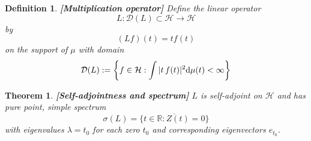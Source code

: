 \documentclass{article}
\newcommand{\assign}{:=}
\newcommand{\mathd}{\mathrm{d}}
\newcommand{\tmstrong}[1]{\textbf{#1}}
\newtheorem{definition}{Definition}
\newtheorem{theorem}{Theorem}
\begin{document}
\begin{definition}
  {\tmstrong{[Multiplication operator]\label{def:L}}} Define the linear
  operator
  \begin{equation}
    L : \mathcal{D} (L) \subset \mathcal{H} \to \mathcal{H}
  \end{equation}
  by
  \begin{equation}
    (Lf) (t) = tf (t)
  \end{equation}
  on the support of $\mu$ with domain
  \begin{equation}
    \mathcal{D} (L) \assign \left\{ f \in \mathcal{H}: \int |t \hspace{0.17em}
    f (t) |^2 \mathd \mu (t) < \infty \right\}
  \end{equation}
\end{definition}

\begin{theorem}
  {\tmstrong{[Self-adjointness and spectrum]\label{thm:spectrum}}} $L$ is
  self-adjoint on $\mathcal{H}$ and has pure point, simple spectrum
  \begin{equation}
    \sigma (L) = \overline{\{t \in \mathbb{R}: Z (t) = 0\}}
  \end{equation}
  with eigenvalues $\lambda = t_0$ for each zero $t_0$ and corresponding
  eigenvectors $e_{t_0}$.
\end{theorem}
\end{document}
